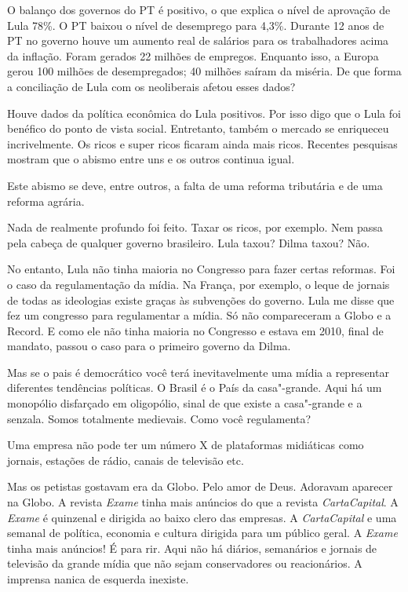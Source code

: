 \falaG O balanço dos governos do PT é positivo, o que explica o nível de
aprovação de Lula 78\%. O PT baixou o nível de desemprego para 4,3\%.
Durante 12 anos de PT no governo houve um aumento real de salários para
os trabalhadores acima da inflação. Foram gerados 22 milhões de
empregos. Enquanto isso, a Europa gerou 100 milhões de desempregados; 40
milhões saíram da miséria. De que forma a conciliação de Lula com os
neoliberais afetou esses dados?

\falaM Houve dados da política econômica do Lula positivos. Por isso digo
que o Lula foi benéfico do ponto de vista social. Entretanto, também o
mercado se enriqueceu incrivelmente. Os ricos e super ricos ficaram
ainda mais ricos. Recentes pesquisas mostram que o abismo entre uns e os
outros continua igual.

\falaG Este abismo se deve, entre outros, a falta de uma reforma tributária
e de uma reforma agrária.

\falaM Nada de realmente profundo foi feito. Taxar os ricos, por exemplo.
Nem passa pela cabeça de qualquer governo brasileiro. Lula taxou? Dilma
taxou? Não.

\falaG No entanto, Lula não tinha maioria no Congresso para fazer certas
reformas. Foi o caso da regulamentação da mídia. Na França, por exemplo,
o leque de jornais de todas as ideologias existe graças às subvenções do
governo. Lula me disse que fez um congresso para regulamentar a mídia.
Só não compareceram a Globo e a Record. E como ele não tinha maioria no
Congresso e estava em 2010, final de mandato, passou o caso para o
primeiro governo da Dilma.

\falaM Mas se o pais é democrático você terá inevitavelmente uma mídia a
representar diferentes tendências políticas. O Brasil é o País da
casa"-grande. Aqui há um monopólio disfarçado em oligopólio, sinal de que
existe a casa"-grande e a senzala. Somos totalmente medievais. Como você
regulamenta?

\falaG Uma empresa não pode ter um número X de plataformas midiáticas como
jornais, estações de rádio, canais de televisão etc.

\falaM Mas os petistas gostavam era da Globo. Pelo amor de Deus. Adoravam
aparecer na Globo. A revista \emph{Exame} tinha mais anúncios do que a
revista \emph{CartaCapital}. A \emph{Exame} é quinzenal e dirigida ao
baixo clero das empresas. A \emph{CartaCapital} e uma semanal de
política, economia e cultura dirigida para um público geral. A
\emph{Exame} tinha mais anúncios! É para rir. Aqui não há diários,
semanários e jornais de televisão da grande mídia que não sejam
conservadores ou reacionários. A imprensa nanica de esquerda inexiste.

